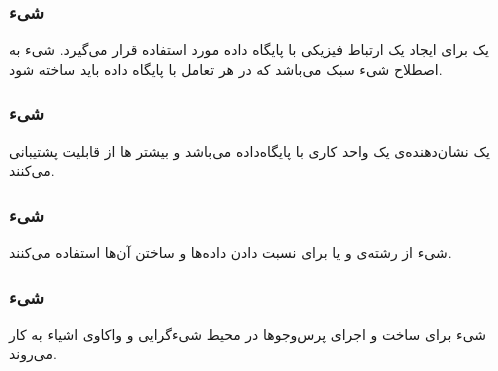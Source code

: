 \documentclass[oneside]{report}
\begin{document}
		\subsubsection{شیء {\small {}} }
یک 
{\normalsize {}} 
برای ایجاد یک ارتباط فیزیکی با پایگاه داده مورد استفاده قرار می‌گیرد. شیء
{\normalsize {}}
 به اصطلاح شیء سبک می‌باشد که در هر تعامل با پایگاه داده باید ساخته شود. 
			\subsubsection{شیء {\small {}} }
	یک 
	{\normalsize {}}
	نشان‌دهنده‌ی یک واحد کاری با پایگاه‌داده می‌باشد و بیشتر 
	{\normalsize {}}
	ها از قابلیت 
	{\normalsize {}}
	پشتیبانی می‌کنند. 
	
			\subsubsection{شیء {\small {}} }	
	شیء 
		{\normalsize {}}
از رشته‌ی 
{\normalsize {}}
و یا
{\normalsize {}}
برای نسبت دادن داده‌ها و ساختن آن‌ها استفاده می‌کنند.  
	
				\subsubsection{شیء {\small {}} }	
	شیء
			{\normalsize {}}
	برای ساخت و اجرای پرس‌وجو‌ها در محیط شیءگرایی و واکاوی اشیاء به کار می‌روند.		
			
\end{document}
